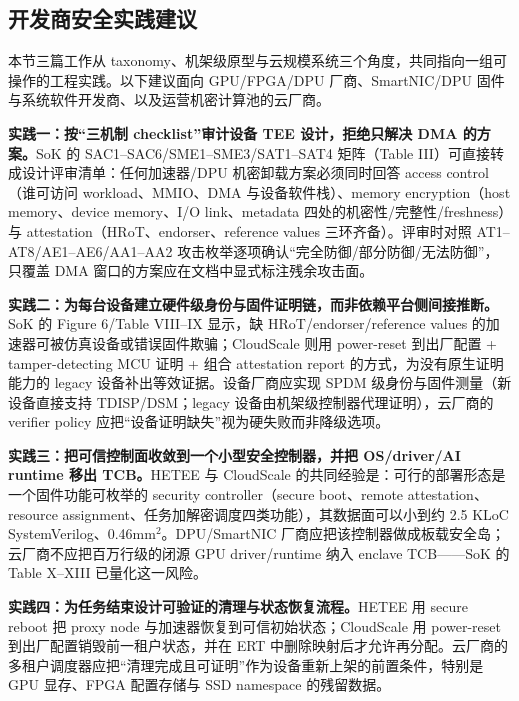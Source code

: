 \documentclass[11pt]{ctexart}
\begin{document}
\subsection{开发商安全实践建议}
本节三篇工作从 taxonomy、机架级原型与云规模系统三个角度，共同指向一组可操作的工程实践。以下建议面向 GPU/FPGA/DPU 厂商、SmartNIC/DPU 固件与系统软件开发商、以及运营机密计算池的云厂商。\par
\noindent\textbf{实践一：按``三机制 checklist''审计设备 TEE 设计，拒绝只解决 DMA 的方案。}SoK 的 SAC1--SAC6/SME1--SME3/SAT1--SAT4 矩阵（Table III）可直接转成设计评审清单：任何加速器/DPU 机密卸载方案必须同时回答 access control（谁可访问 workload、MMIO、DMA 与设备软件栈）、memory encryption（host memory、device memory、I/O link、metadata 四处的机密性/完整性/freshness）与 attestation（HRoT、endorser、reference values 三环齐备）\cite{sok-tee}。评审时对照 AT1--AT8/AE1--AE6/AA1--AA2 攻击枚举逐项确认``完全防御/部分防御/无法防御''，只覆盖 DMA 窗口的方案应在文档中显式标注残余攻击面。\par
\noindent\textbf{实践二：为每台设备建立硬件级身份与固件证明链，而非依赖平台侧间接推断。}SoK 的 Figure 6/Table VIII--IX 显示，缺 HRoT/endorser/reference values 的加速器可被仿真设备或错误固件欺骗\cite{sok-tee}；CloudScale 则用 power-reset 到出厂配置 + tamper-detecting MCU 证明 + 组合 attestation report 的方式，为没有原生证明能力的 legacy 设备补出等效证据\cite{dhar2024cloudscale}。设备厂商应实现 SPDM 级身份与固件测量（新设备直接支持 TDISP/DSM；legacy 设备由机架级控制器代理证明），云厂商的 verifier policy 应把``设备证明缺失''视为硬失败而非降级选项。\par
\noindent\textbf{实践三：把可信控制面收敛到一个小型安全控制器，并把 OS/driver/AI runtime 移出 TCB。}HETEE 与 CloudScale 的共同经验是：可行的部署形态是一个固件功能可枚举的 security controller（secure boot、remote attestation、resource assignment、任务加解密调度四类功能）\cite{zhu2020hetee}，其数据面可以小到约 2.5 KLoC SystemVerilog、0.46mm$^2$\cite{dhar2024cloudscale}。DPU/SmartNIC 厂商应把该控制器做成板载安全岛；云厂商不应把百万行级的闭源 GPU driver/runtime 纳入 enclave TCB——SoK 的 Table X--XIII 已量化这一风险\cite{sok-tee}。\par
\noindent\textbf{实践四：为任务结束设计可验证的清理与状态恢复流程。}HETEE 用 secure reboot 把 proxy node 与加速器恢复到可信初始状态\cite{zhu2020hetee}；CloudScale 用 power-reset 到出厂配置销毁前一租户状态，并在 ERT 中删除映射后才允许再分配\cite{dhar2024cloudscale}。云厂商的多租户调度器应把``清理完成且可证明''作为设备重新上架的前置条件，特别是 GPU 显存、FPGA 配置存储与 SSD namespace 的残留数据。\par
\end{document}
